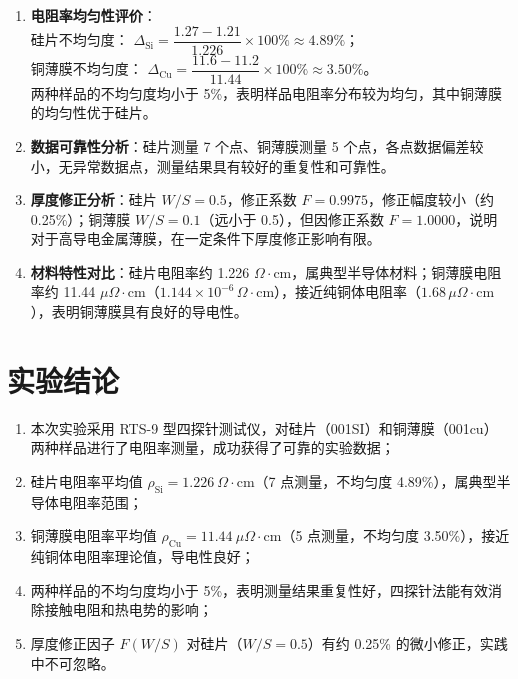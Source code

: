 \begin{enumerate}[label=\arabic*、, leftmargin=4em, labelsep=0pt]
    \item \textbf{电阻率均匀性评价}：\\
    硅片不均匀度：
    $\Delta_{\text{Si}} = \dfrac{1.27 - 1.21}{1.226} \times 100\% \approx 4.89\%$；\\
    铜薄膜不均匀度：
    $\Delta_{\text{Cu}} = \dfrac{11.6 - 11.2}{11.44} \times 100\% \approx 3.50\%$。\\
    两种样品的不均匀度均小于 5\%，表明样品电阻率分布较为均匀，其中铜薄膜的均匀性优于硅片。
    
    \item \textbf{数据可靠性分析}：硅片测量 7 个点、铜薄膜测量 5 个点，各点数据偏差较小，无异常数据点，测量结果具有较好的重复性和可靠性。
    
    \item \textbf{厚度修正分析}：硅片 $W/S = 0.5$，修正系数 $F = 0.9975$，修正幅度较小（约 0.25\%）；铜薄膜 $W/S = 0.1$（远小于 0.5），但因修正系数 $F = 1.0000$，说明对于高导电金属薄膜，在一定条件下厚度修正影响有限。
    
    \item \textbf{材料特性对比}：硅片电阻率约 1.226 $\Omega \cdot \text{cm}$，属典型半导体材料；铜薄膜电阻率约 11.44 $\mu\Omega \cdot \text{cm}$（$1.144 \times 10^{-6}\,\Omega \cdot \text{cm}$），接近纯铜体电阻率（$1.68\,\mu\Omega \cdot \text{cm}$），表明铜薄膜具有良好的导电性。
\end{enumerate}

\section{实验结论}

\begin{enumerate}[label=\arabic*、, leftmargin=4em, labelsep=0pt]
    \item 本次实验采用 RTS-9 型四探针测试仪，对硅片（001SI）和铜薄膜（001cu）两种样品进行了电阻率测量，成功获得了可靠的实验数据；
    \item 硅片电阻率平均值 $\rho_{\text{Si}} = 1.226\ \Omega \cdot \text{cm}$（7 点测量，不均匀度 4.89\%），属典型半导体电阻率范围；
    \item 铜薄膜电阻率平均值 $\rho_{\text{Cu}} = 11.44\ \mu\Omega \cdot \text{cm}$（5 点测量，不均匀度 3.50\%），接近纯铜体电阻率理论值，导电性良好；
    \item 两种样品的不均匀度均小于 5\%，表明测量结果重复性好，四探针法能有效消除接触电阻和热电势的影响；
    \item 厚度修正因子 $F(W/S)$ 对硅片（$W/S = 0.5$）有约 0.25\% 的微小修正，实践中不可忽略。
\end{enumerate}

